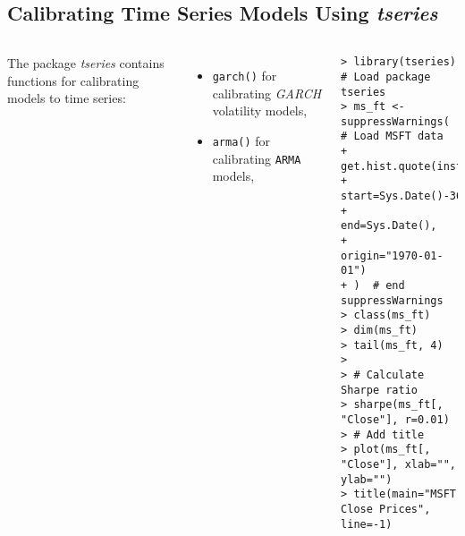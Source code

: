\documentclass[10pt]{beamer}\usepackage[]{graphicx}\usepackage[]{color}
\makeatletter
\newenvironment{kframe}{%
 \def\at@end@of@kframe{}%
 \ifinner\ifhmode%
  \def\at@end@of@kframe{\end{minipage}}%
  \begin{minipage}{\columnwidth}%
 \fi\fi%
 \def\FrameCommand##1{\hskip\@totalleftmargin \hskip-\fboxsep
 \colorbox{shadecolor}{##1}\hskip-\fboxsep
     \hskip-\linewidth \hskip-\@totalleftmargin \hskip\columnwidth}%
 \MakeFramed {\advance\hsize-\width
   \@totalleftmargin\z@ \linewidth\hsize
   \@setminipage}}%
 {\par\unskip\endMakeFramed%
 \at@end@of@kframe}
\newenvironment{knitrout}{}{} %
\makeatother
\begin{document}
\subsection{Calibrating Time Series Models Using \protect\emph{tseries}}
\begin{frame}[fragile,t]{\subsecname}
\vspace{-1em}
\begin{block}{}
  \begin{columns}[T]
      The package \emph{tseries} contains functions for calibrating models to time series:
      \begin{itemize}
        \item \texttt{garch()} for calibrating \emph{GARCH} volatility models,
        \item \texttt{arma()} for calibrating \texttt{ARMA} models,
      \end{itemize}
      \vspace{-1em}
\begin{knitrout}\tiny
{}\color{fgcolor}\begin{kframe}
\begin{verbatim}
> library(tseries)  # Load package tseries
> ms_ft <- suppressWarnings(  # Load MSFT data
+   get.hist.quote(instrument="MSFT",
+            start=Sys.Date()-365,
+            end=Sys.Date(),
+            origin="1970-01-01")
+ )  # end suppressWarnings
> class(ms_ft)
> dim(ms_ft)
> tail(ms_ft, 4)
> 
> # Calculate Sharpe ratio
> sharpe(ms_ft[, "Close"], r=0.01)
> # Add title
> plot(ms_ft[, "Close"], xlab="", ylab="")
> title(main="MSFT Close Prices", line=-1)
\end{verbatim}
\end{kframe}
\end{knitrout}
  \end{columns}
\end{block}

\end{frame}


\end{document}
